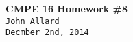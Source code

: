 \documentclass[a4paper,10pt]{article}
\begin{document}
   \begin{center}
      \Large\textbf{CMPE 16 Homework \#8}\\
      \large\texttt{John Allard} \\
      \small\texttt{Decmber 2nd, 2014}
   \end{center}

\end{document}
